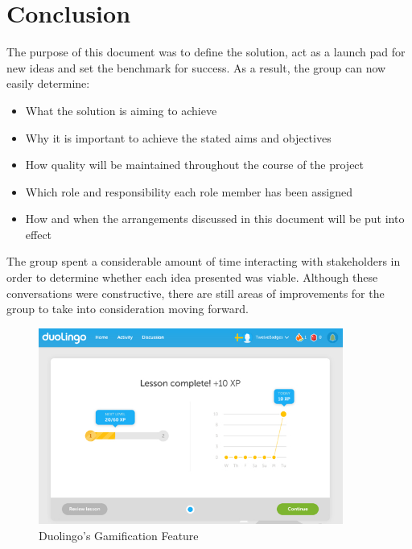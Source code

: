 \section{Conclusion}

The purpose of this document was to define the solution, act as a launch pad for new ideas and set the benchmark for success. As a result, the group can now easily determine:

\begin{itemize}
  \item What the solution is aiming to achieve
  \item Why it is important to achieve the stated aims and objectives
  \item How quality will be maintained throughout the course of the project
  \item Which role and responsibility each role member has been assigned
  \item How and when the arrangements discussed in this document will be put into effect
\end{itemize}

The group spent a considerable amount of time interacting with stakeholders in order to determine whether each idea presented was viable. Although these conversations were constructive, there are still areas of improvements for the group to take into consideration moving forward. 

\begin{figure}
  \centering
  \begin{minipage}{10cm}
    \centering
    \includegraphics[width=10cm]{inc/duolingo_gamification.jpg}
    \caption{Duolingo's Gamification Feature}
    \label{fig:duolingo_gamification}
  \end{minipage}
\end{figure}

